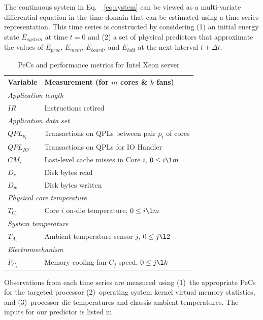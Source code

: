 \documentclass[times, 10pt,twocolumn]{IEEEtran}
\newcommand{\equationnames}{Eq.\ }
\begin{document}
The continuous system in \equationnames~\eqref{eq:system} can be viewed
as a multi-variate differential equation in the time domain that can be
estimated using a time series representation. This time series is
constructed by considering (1) an initial energy state $E_{system}$ at
time $t=0$ and (2) a set of physical predictors that approximate the
values of $E_{proc}$, $E_{mem}$, $E_{board}$, and $E_{hdd}$ at the next
interval $t+\Delta t$.

\begin{small}
\begin{table}[tbhp]
  \centering
  \caption{PeCs and performance metrics for Intel Xeon server}
  \label{tab:intelmodel}
  \begin{tabular}{l l}
\hline
\hline
\textbf{Variable}&\textbf{Measurement} (for $m$ cores \& $k$ fans)\\
\hline
\hline
\multicolumn{2}{l}{\textit{Application length}}\\
$IR$&Instructions retired \\
\hline
\multicolumn{2}{l}{\textit{Application data set}}\\
$QPL_{p_t}$&Transactions on QPLs between pair $p_t$ of cores\\
$QPL_{IO}$&Transactions on QPLs for IO Handler\\
$CM_{i}$&Last-level cache misses in  Core $i$, $0\leq i \l m$\\
$D_{r}$&Disk bytes read\\
$D_{w}$&Disk bytes written\\
\hline
\multicolumn{2}{l}{\textit{Physical core temperature}}\\
$T_{C_{i}}$&Core $i$ on-die temperature, $0\leq i \l m$\\
\hline
\multicolumn{2}{l}{\textit{System temperature}}\\
$T_{A_{i}}$&Ambient temperature sensor $j$, $0\leq j \l 2$\\
\hline
\multicolumn{2}{l}{\textit{Electromechanism}}\\
$F_{C_{i}}$&Memory cooling fan $C_j$ speed, $0\leq j \l k$\\
\hline
  \end{tabular}
\end{table}
\end{small}
Observations from each time series are measured using (1)~the
appropriate PeCs for the targeted processor (2)~operating system kernel
virtual memory statistics, and (3)~processor die temperatures and
chassis ambient temperatures.  The inputs for our predictor is listed in
\end{document}
